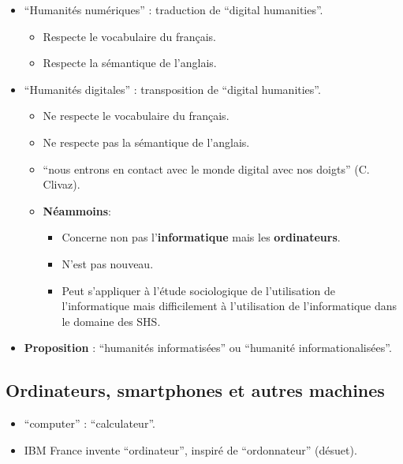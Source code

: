 \documentclass{beamer}
\newcommand{\forme}[1]{\enquote{#1}}
\newcommand{\formeenglish}[1]{\forme{\textenglish{#1}}}
\begin{document}
\begin{frame}
	\begin{itemize}
		\item \forme{Humanités numériques} : traduction de \forme{digital humanities}.
		\begin{itemize}
			\item Respecte le vocabulaire du français.
			\item Respecte la sémantique de l'anglais.
		\end{itemize}
		
		\item \forme{Humanités digitales} : transposition de \forme{digital humanities}.
			\begin{itemize}
				\item Ne respecte le vocabulaire du français.
				\item Ne respecte pas la sémantique de l'anglais.
				\item {} \enquote{nous entrons en contact avec le monde digital avec nos doigts} (C. Clivaz). %
				\item \textbf{Néammoins}:
				\begin{itemize}
					\item Concerne non pas l'\textbf{informatique} mais les \textbf{ordinateurs}.
					\item N'est pas nouveau.
					\item Peut s'appliquer à l'étude sociologique de l'utilisation de l'informatique mais difficilement à l'utilisation de l'informatique dans le domaine des SHS.
				\end{itemize}
			\end{itemize}
		\item \textbf{Proposition} : \forme{humanités informatisées} ou \forme{humanité informationalisées}.
	\end{itemize}
\end{frame}
\subsection{Ordinateurs, smartphones et autres machines}

\begin{frame}
	\begin{itemize}
		\item \formeenglish{computer} : \forme{calculateur}.
		\item IBM France invente \forme{ordinateur}, inspiré de \forme{ordonnateur} (désuet).
	\end{itemize}
\end{frame}
\end{document}
